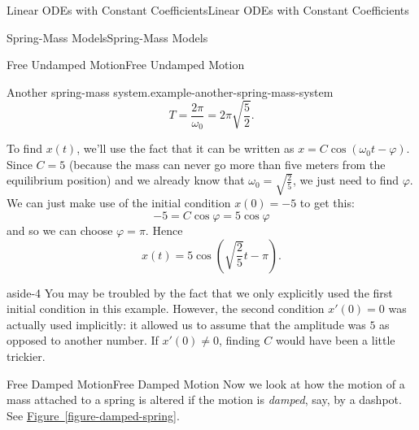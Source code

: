 \documentclass[10pt,]{book}
\numberwithin{equation}{section}
\begin{document}
\begin{chapterptx}{Linear ODEs with Constant Coefficients}{}{Linear ODEs with Constant Coefficients}{}{}
\begin{sectionptx}{Spring-Mass Models}{}{Spring-Mass Models}{}{}
\begin{subsectionptx}{Free Undamped Motion}{}{Free Undamped Motion}{}{}
\begin{example}{Another spring-mass system.}{example-another-spring-mass-system}
\begin{equation*}
T = \frac{2\pi}{\omega_{0}} = 2\pi\sqrt{\frac{5}{2}}.
\end{equation*}
%
\par
\hypertarget{p-207}{}%
To find \(x(t)\), we'll use the fact that it can be written as \(x = C\cos(\omega_{0}t-\varphi)\). Since \(C = 5\) (because the mass can never go more than five meters from the equilibrium position) and we already know that \(\omega_{0} = \sqrt{\frac{2}{5}}\), we just need to find \(\varphi\). We can just make use of the initial condition \(x(0) = -5\) to get this:%
\begin{equation*}
-5 = C\cos\varphi = 5\cos\varphi
\end{equation*}
and so we can choose \(\varphi=\pi\). Hence%
\begin{equation*}
x(t) = 5\cos(\sqrt{\frac{2}{5}}t-\pi).
\end{equation*}
%
\end{example}
\begin{aside}{}{aside-4}%
\hypertarget{p-208}{}%
You may be troubled by the fact that we only explicitly used the first initial condition in this example. However, the second condition \(x'(0) = 0\) was actually used implicitly: it allowed us to assume that the amplitude was \(5\) as opposed to another number. If \(x'(0)\neq0\), finding \(C\) would have been a little trickier.%
\end{aside}
\end{subsectionptx}
%
%
\typeout{************************************************}
\typeout{************************************************}
%
\begin{subsectionptx}{Free Damped Motion}{}{Free Damped Motion}{}{}\label{subsection-free-damped-motion}
\hypertarget{p-209}{}%
Now we look at how the motion of a mass attached to a spring is altered if the motion is \emph{damped}, say, by a dashpot. See \hyperref[figure-damped-spring]{Figure~\ref{figure-damped-spring}}.%
\begin{figure}
\centering
{
}
\end{figure}
\end{subsectionptx}
\end{sectionptx}
\end{chapterptx}
\end{document}
